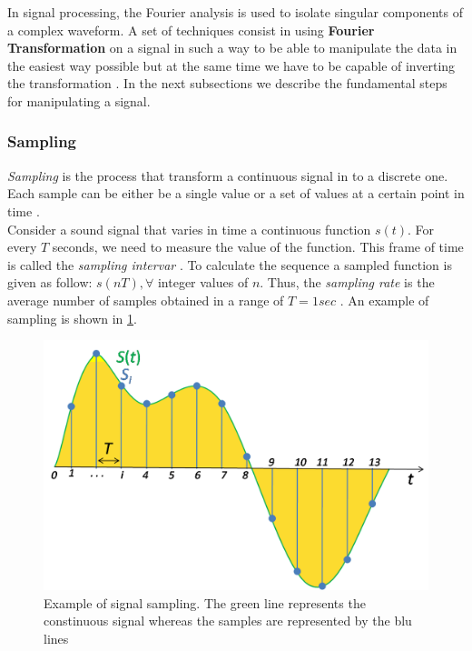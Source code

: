 \noindent In signal processing, the Fourier analysis is used to isolate singular components of a complex waveform. A set of techniques consist in using \textbf{Fourier Transformation} on a signal in such a way to be able to manipulate the data in the easiest way possible but at the same time we have to be capable of inverting the transformation \cite{fa_wiki} \cite{rabiner1975theory}. In the next subsections we describe the fundamental steps for manipulating a signal.

\subsubsection{Sampling}
\label{ssubs:sampling}
\textit{Sampling} is the process that transform a continuous signal in to a discrete one. Each sample can be either be a single value or a set of values at a certain point in time \cite{sampling_wiki}. \\ 
\noindent Consider a sound signal that varies in time a continuous function $s(t)$. For every $T$ seconds, we need to measure the value of the function. This frame of time is called the \textit{sampling intervar} \cite{weik2012communications}. To calculate the sequence a sampled function is given as follow: $s(nT), \forall$ integer values of $n$. Thus, the \textit{sampling rate} is the average number of samples obtained in a range of $T = 1sec$ \cite{sampling_wiki}. An example of sampling is shown in \ref{fig:sampling_ex}.

\begin{figure}[!ht]
	\centering
	\includegraphics[scale=0.2]{Figures/sampling_example.png}
	\caption{Example of signal sampling. The green line represents the constinuous signal whereas the samples are represented by the blu lines \cite{sampling_wiki}}
	\label{fig:sampling_ex}
\end{figure}


